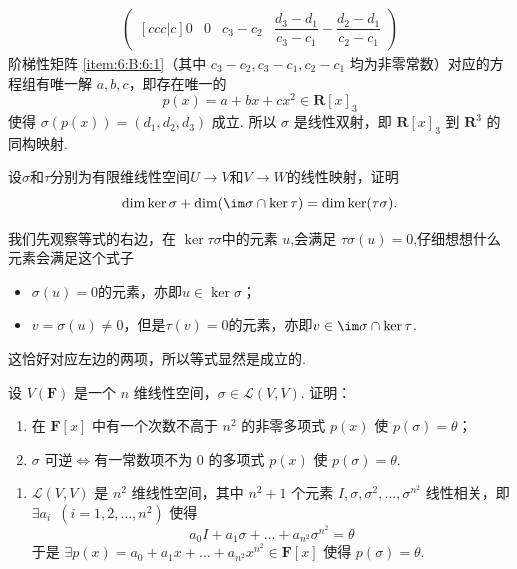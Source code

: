 \begin{exercise}
\begin{exgroup}
\begin{answer}
\begin{align}
\begin{pmatrix}[ccc|c]
                                   0 & 0   & c_3 - c_2 & \dfrac{d_3 - d_1}{c_3 - c_1} - \dfrac{d_2 - d_1}{c_2 - c_1}
                               \end{pmatrix} \label{item:6:B:6:1}
          \end{align}
          阶梯性矩阵 \ref*{item:6:B:6:1}（其中 $ c_3 - c_2, c_3 - c_1, c_2 - c_1 $ 均为非零常数）对应的方程组有唯一解 $ a, b, c $，即存在唯一的
          \[ p(x) = a + bx + cx^2 \in \mathbf{R}[x]_3 \]
          使得 $ \sigma(p(x)) = (d_1, d_2, d_3) $ 成立. 所以 $ \sigma $ 是线性双射，即 $ \mathbf{R}[x]_3 $ 到 $ \mathbf{R}^3 $ 的同构映射.
        \end{answer}

        \item 设$\sigma$和$\tau$分别为有限维线性空间$U\to V$和$V\to W$的线性映射，证明
        \[\dim\ker\sigma+\dim(\im\sigma\cap\ker\tau)=\dim\ker(\tau\sigma).\]

        \begin{answer}
            我们先观察等式的右边，在 $\ker \tau \sigma$中的元素 $u$,会满足 $\tau \sigma (u) = 0 $,仔细想想什么元素会满足这个式子
            \begin{itemize}
                \item $\sigma(u)=0$的元素，亦即$u\in \ker \sigma$；
                \item $v=\sigma(u)\neq 0$，但是$\tau(v)=0$的元素，亦即$v\in \im \sigma \cap \ker \tau$.
            \end{itemize}
            这恰好对应左边的两项，所以等式显然是成立的.
        \end{answer}
    \end{exgroup}

    \begin{exgroup}
        \item 设 $V(\mathbf{F})$ 是一个 $n$ 维线性空间，$\sigma \in \mathcal{L}(V,V)$. 证明：
        \begin{enumerate}
            \item 在 $\mathbf{F}[x]$ 中有一个次数不高于 $n^2$ 的非零多项式 $p(x)$ 使 $p(\sigma) = \theta$；

            \item $\sigma$ 可逆$\iff$有一常数项不为 0 的多项式 $p(x)$ 使 $p(\sigma) = \theta$.
        \end{enumerate}
        \begin{answer}
            \begin{enumerate}
                \item \label{item:5:C:1:1}
                      $ \mathcal{L}(V, V) $ 是 $ n^2 $ 维线性空间，其中 $ n^2 + 1 $ 个元素 $ I, \sigma, \sigma^2, \ldots, \sigma^{n^2} $ 线性相关，即 $ \exists a_i\enspace (i = 1, 2, \ldots, n^2) $ 使得
                      \[ a_0 I + a_1 \sigma + \ldots + a_{n^2} \sigma^{n^2} = \theta \]
                      于是 $ \exists p(x) = a_0 + a_1 x + \ldots + a_{n^2} x^{n^2} \in \mathbf{F}[x] $ 使得 $ p(\sigma) = \theta $.


\end{enumerate}
\end{answer}
\end{exgroup}
\end{exercise}
